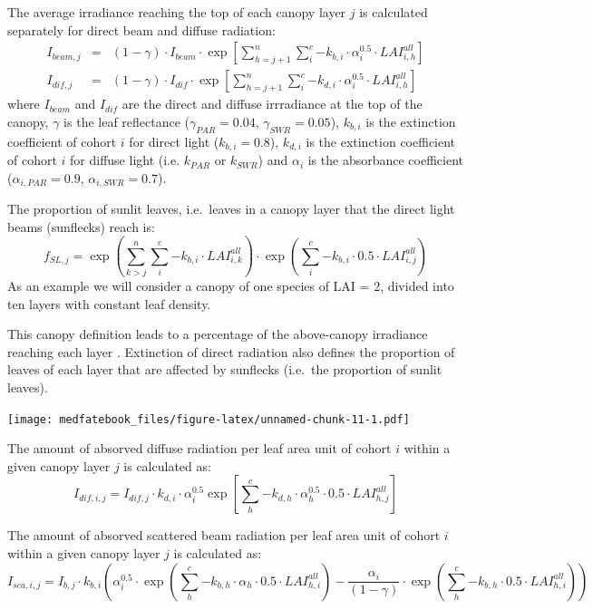 \documentclass[]{book}
\begin{document}
The average irradiance reaching the top of each canopy layer \(j\) is calculated separately for direct beam and diffuse radiation:
\begin{eqnarray}
I_{beam,j} &=& (1 - \gamma) \cdot I_{beam} \cdot \exp\left[ \sum_{h=j+1}^{n}{\sum_{i}^{c}{-k_{b,i}\cdot \alpha_i^{0.5}\cdot LAI^{all}_{i,h}}}\right]\\
I_{dif,j} &=& (1 - \gamma) \cdot I_{dif} \cdot \exp\left[ \sum_{h=j+1}^{n}{\sum_{i}^{c}{-k_{d,i}\cdot \alpha_i^{0.5}\cdot LAI^{all}_{i,h}}}\right]
\end{eqnarray}
where \(I_{beam}\) and \(I_{dif}\) are the direct and diffuse irrradiance at the top of the canopy, \(\gamma\) is the leaf reflectance (\(\gamma_{PAR} = 0.04\), \(\gamma_{SWR} = 0.05\)), \(k_{b,i}\) is the extinction coefficient of cohort \(i\) for direct light (\(k_{b,i} = 0.8\)), \(k_{d,i}\) is the extinction coefficient of cohort \(i\) for diffuse light (i.e. \(k_{PAR}\) or \(k_{SWR}\)) and \(\alpha_i\) is the absorbance coefficient (\(\alpha_{i,PAR} = 0.9\), \(\alpha_{i,SWR} = 0.7\)).

The proportion of sunlit leaves, i.e.~leaves in a canopy layer that the direct light beams (sunflecks) reach is:
\begin{equation}
f_{SL, j}  = \exp\left( \sum_{k>j}^{n}{\sum_{i}^{c}{-k_{b,i} \cdot LAI^{all}_{i,k}}}\right) \cdot \exp\left( \sum_{i}^{c}{-k_{b,i} \cdot 0.5\cdot LAI^{all}_{i,j}}\right)
\end{equation}
As an example we will consider a canopy of one species of LAI = 2, divided into ten layers with constant leaf density.

This canopy definition leads to a percentage of the above-canopy irradiance reaching each layer \citep{Anten2016}. Extinction of direct radiation also defines the proportion of leaves of each layer that are affected by sunflecks (i.e.~the proportion of sunlit leaves).

\texttt{[image: medfatebook\_files/figure-latex/unnamed-chunk-11-1.pdf]}

The amount of absorved diffuse radiation per leaf area unit of cohort \(i\) within a given canopy layer \(j\) is calculated as:
\begin{equation}
I_{dif,i,j} = I_{dif,j} \cdot k_{d,i} \cdot \alpha_i^{0.5} \exp\left[ \sum_{h}^{c}{-k_{d,h}\cdot \alpha_h^{0.5}\cdot 0.5\cdot LAI^{all}_{h,j}}\right]
\end{equation}

The amount of absorved scattered beam radiation per leaf area unit of cohort \(i\) within a given canopy layer \(j\) is calculated as:
\begin{equation}
I_{sca,i,j} = I_{b,j} \cdot k_{b,i} \left( \alpha_i^{0.5}\cdot \exp \left( \sum_{h}^{c}{-k_{b,h}\cdot \alpha_h\cdot 0.5\cdot LAI^{all}_{h,i}}\right) 
-\frac{\alpha_i}{(1-\gamma)}\cdot \exp\left( \sum_{h}^{c}{-k_{b,h}\cdot 0.5\cdot LAI^{all}_{h,i}}\right) \right)
\end{equation}
\end{document}
